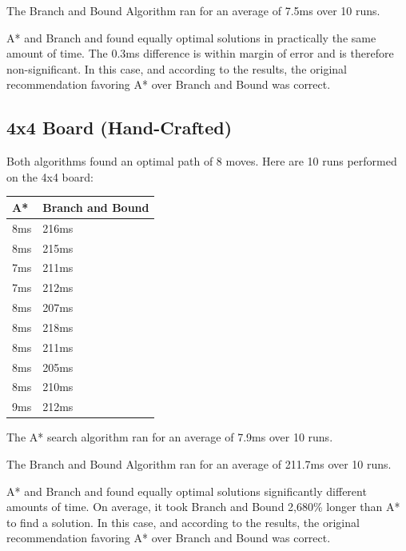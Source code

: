 \documentclass[12pt, letterpaper, final, onecolumn, titlepage] {article}
\begin{document}
\noindent The Branch and Bound Algorithm ran for an average of 7.5ms over 10 runs.

\noindent A* and Branch and found equally optimal solutions in practically the same amount of time.  The 0.3ms difference is within margin of error and is therefore non-significant.  In this case, and according to the results, the original recommendation favoring A* over Branch and Bound was correct.

\newpage

\subsection{4x4 Board (Hand-Crafted)}
Both algorithms found an optimal path of 8 moves.  Here are 10 runs performed on the 4x4 board:
\begin{center}
\begin{tabular}{|p{4cm}|p{4cm}|}
\hline
\textbf{A*} & \textbf{Branch and Bound} \\
\hline
8ms & 216ms \\
\hline
8ms & 215ms \\
\hline
7ms & 211ms \\
\hline
7ms & 212ms \\
\hline
8ms & 207ms \\
\hline
8ms & 218ms \\
\hline
8ms & 211ms \\
\hline
8ms & 205ms \\
\hline
8ms & 210ms \\
\hline
9ms & 212ms \\
\hline
\end{tabular}
\end{center}
\noindent The A* search algorithm ran for an average of 7.9ms over 10 runs.

\noindent The Branch and Bound Algorithm ran for an average of 211.7ms over 10 runs.

\noindent A* and Branch and found equally optimal solutions significantly different amounts of time.  On average, it took Branch and Bound 2,680\% longer than A* to find a solution. In this case, and according to the results, the original recommendation favoring A* over Branch and Bound was correct.

\newpage
\end{document}

